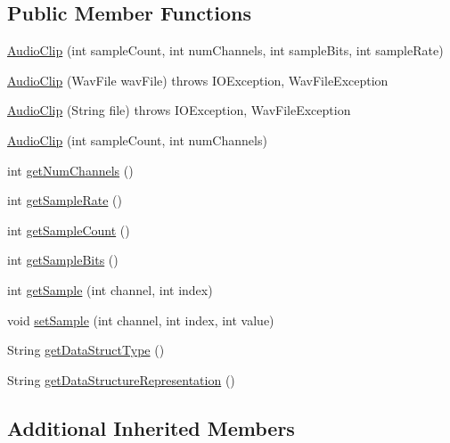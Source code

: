 \subsection*{Public Member Functions}
\begin{DoxyCompactItemize}
\item 
\hyperlink{classbridges_1_1base_1_1_audio_clip_a83e87997fd53dbcbde7680b90c1ff3f2}{Audio\+Clip} (int sample\+Count, int num\+Channels, int sample\+Bits, int sample\+Rate)
\item 
\hyperlink{classbridges_1_1base_1_1_audio_clip_aece4ed61f09688a54e636ce3dc206239}{Audio\+Clip} (Wav\+File wav\+File)  throws I\+O\+Exception, Wav\+File\+Exception 	
\item 
\hyperlink{classbridges_1_1base_1_1_audio_clip_a70d5f6f10dad6da2f27bb04b7021e2fa}{Audio\+Clip} (String file)  throws I\+O\+Exception, Wav\+File\+Exception 	
\item 
\hyperlink{classbridges_1_1base_1_1_audio_clip_aca2a5258c29b104bf8216ae5ec3c5938}{Audio\+Clip} (int sample\+Count, int num\+Channels)
\item 
int \hyperlink{classbridges_1_1base_1_1_audio_clip_a09e8b5da5249851f7583e910f24b0395}{get\+Num\+Channels} ()
\item 
int \hyperlink{classbridges_1_1base_1_1_audio_clip_a610df43929946a6186e6739e361916eb}{get\+Sample\+Rate} ()
\item 
int \hyperlink{classbridges_1_1base_1_1_audio_clip_a8ad739b7a085787028b4278d65b1b3f4}{get\+Sample\+Count} ()
\item 
int \hyperlink{classbridges_1_1base_1_1_audio_clip_a59e5a3f38768e52c15e43b5679f3f09c}{get\+Sample\+Bits} ()
\item 
int \hyperlink{classbridges_1_1base_1_1_audio_clip_ad580089aece17000fe838bed4dd8200a}{get\+Sample} (int channel, int index)
\item 
void \hyperlink{classbridges_1_1base_1_1_audio_clip_ae773ae030f39011060ae6088f19812f9}{set\+Sample} (int channel, int index, int value)
\item 
String \hyperlink{classbridges_1_1base_1_1_audio_clip_ad1941b14198946a14d218d7be47f94b5}{get\+Data\+Struct\+Type} ()
\item 
String \hyperlink{classbridges_1_1base_1_1_audio_clip_a8ed51c9a938b94d11f274d663a0c9fd4}{get\+Data\+Structure\+Representation} ()
\end{DoxyCompactItemize}
\subsection*{Additional Inherited Members}


